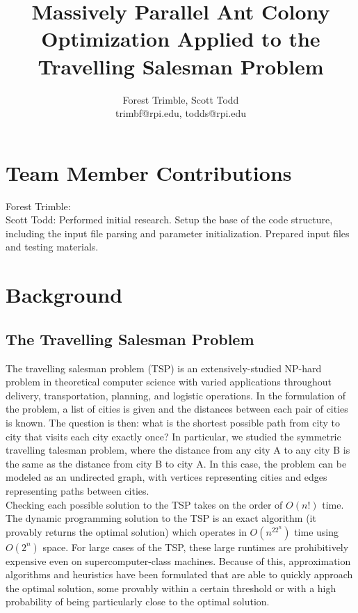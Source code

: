 \documentclass[twocolumn]{article}
\title{Massively Parallel Ant Colony Optimization Applied to the Travelling Salesman Problem}
\author{Forest Trimble, Scott Todd\\trimbf@rpi.edu, todds@rpi.edu}
\begin{document}
\maketitle

\pagestyle{fancy}
\fancyhead{}
\fancyfoot{}
\fancyhead[R]{\thepage}


\section{Team Member Contributions}

Forest Trimble: \\

\noindent Scott Todd: Performed initial research. Setup the base of the code 
structure, including the input file parsing and parameter initialization. 
Prepared input files and testing materials.



\section{Background}

\subsection{The Travelling Salesman Problem}

The travelling salesman problem (TSP) is an extensively-studied NP-hard problem 
in theoretical computer science with varied applications throughout delivery, 
transportation, planning, and logistic operations. In the formulation of the 
problem, a list of cities is given and the distances between each pair of cities
is known. The question is then: what is the shortest possible path from city to
city that visits each city exactly once? In particular, we studied the symmetric
travelling talesman problem, where the distance from any city A to any city B
is the same as the distance from city B to city A. In this case, the problem
can be modeled as an undirected graph, with vertices representing cities and
edges representing paths between cities.\\

Checking each possible solution to the TSP takes on the order of $O(n!)$ time. 
The dynamic programming solution to the TSP is an exact algorithm (it provably 
returns the optimal solution) which operates in $O(n^22^n)$ time using $O(2^n)$
space. For large cases of the TSP, these large runtimes are prohibitively 
expensive even on supercomputer-class machines. Because of this, approximation 
algorithms and heuristics have been formulated that are able to quickly 
approach the optimal solution, some provably within a certain threshold or with 
a high probability of being particularly close to the optimal solution.\\
\end{document}
